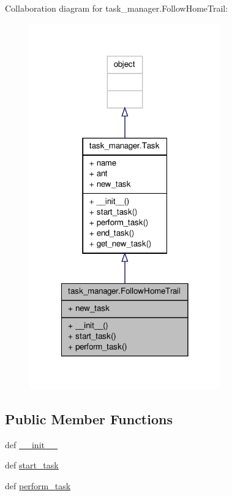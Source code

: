 Collaboration diagram for task\+\_\+manager.\+Follow\+Home\+Trail\+:\nopagebreak
\begin{figure}[H]
\begin{center}
\leavevmode
\includegraphics[width=234pt]{classtask__manager_1_1FollowHomeTrail__coll__graph}
\end{center}
\end{figure}
\subsection*{Public Member Functions}
\begin{DoxyCompactItemize}
\item 
def \hyperlink{classtask__manager_1_1FollowHomeTrail_a644c02e687f8a412a39e81628742f3b5}{\+\_\+\+\_\+init\+\_\+\+\_\+}
\item 
def \hyperlink{classtask__manager_1_1FollowHomeTrail_a0ffd4aabfafcfead05a02e149e5fab91}{start\+\_\+task}
\item 
def \hyperlink{classtask__manager_1_1FollowHomeTrail_ae4386ef7470e20e3f42fab9fc65b70cb}{perform\+\_\+task}
\end{DoxyCompactItemize}
